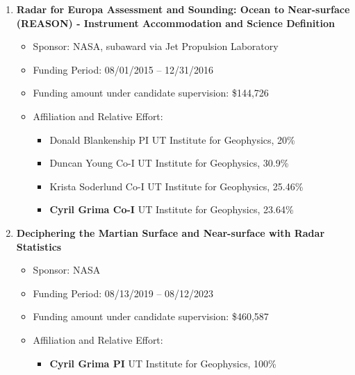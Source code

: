 \begin{enumerate}[leftmargin=2.5em, labelsep=1.5em, label=E\arabic*]
    \item
        \textbf{Radar for Europa Assessment and Sounding: Ocean to Near-surface (REASON) - Instrument Accommodation and Science Definition}
        \begin{itemize}[leftmargin=0em, labelsep=1em, topsep=-.5em, itemsep=-.2em]
            \item Sponsor: NASA, subaward via Jet Propulsion Laboratory
            \item Funding Period: 08/01/2015 – 12/31/2016
            \item Funding amount under candidate supervision: \$144,726
            \item Affiliation and Relative Effort:
            \TabPositions{4cm, 5.5cm}
            \begin{itemize}[leftmargin=2em, labelsep=1em, topsep=-.5em, itemsep=-.2em]
                \item Donald Blankenship \tab PI \tab UT Institute for Geophysics, 20\%
                \item Duncan Young \tab Co-I \tab  UT Institute for Geophysics, 30.9\%
                \item Krista Soderlund \tab Co-I \tab  UT Institute for Geophysics, 25.46\% 
                \item \textbf{Cyril Grima \tab Co-I} \tab  UT Institute for Geophysics, 23.64\%
            \end{itemize}
        \end{itemize}

    \item
        \textbf{Deciphering the Martian Surface and Near-surface with Radar Statistics}
        \begin{itemize}[leftmargin=0em, labelsep=1em, topsep=-.5em, itemsep=-.2em]
            \item Sponsor: NASA
            \item Funding Period: 08/13/2019 – 08/12/2023
            \item Funding amount under candidate supervision: \$460,587
            \item Affiliation and Relative Effort:
            \TabPositions{4cm, 5.5cm}
            \begin{itemize}[leftmargin=2em, labelsep=1em, topsep=-.5em, itemsep=-.2em]
                \item \textbf{Cyril Grima \tab PI} \tab  UT Institute for Geophysics, 100\%
            \end{itemize}
        \end{itemize}


\end{enumerate}
